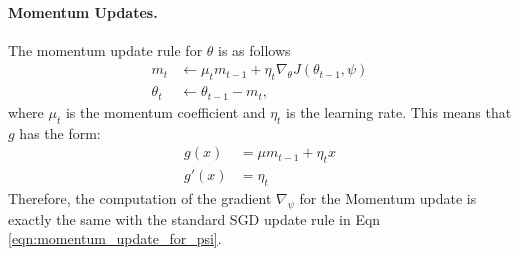 \paragraph{Momentum Updates.} The momentum update rule for $\theta$ is as follows
\begin{equation}
  \label{eqn:momentum_update}
  \begin{aligned}
    m_t &\leftarrow \mu_t m_{t-1} + \eta_t \nabla_\theta J(\theta_{t-1}, \psi) \\
    \theta_t &\leftarrow \theta_{t-1} - m_t,
  \end{aligned}
\end{equation}
where $\mu_t$ is the momentum coefficient and $\eta_t$ is the learning rate. This means that $g$ has the form:
\begin{equation}
  \label{eqn:momentum_update_g}
  \begin{aligned}
    g(x) &= \mu m_{t-1} + \eta_t x \\
    g'(x) &= \eta_t
  \end{aligned}
\end{equation}
Therefore, the computation of the gradient $\nabla_{\psi}$ for the Momentum update is exactly the same with the standard SGD update rule in Eqn \ref{eqn:momentum_update_for_psi}.

